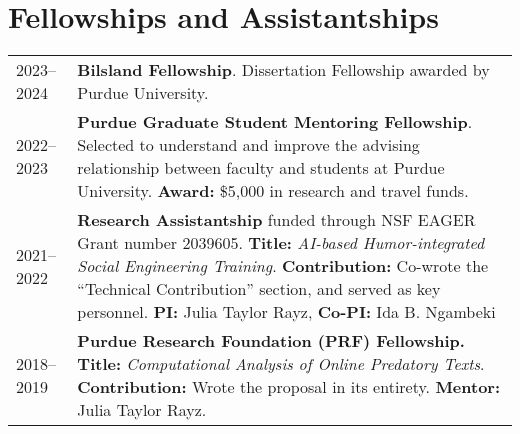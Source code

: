 \documentclass[11pt]{article}
\begin{document}
\section*{Fellowships and Assistantships}
\vspace{-.5em}
\renewcommand*{\arraystretch}{1.5}
\begin{tabularx}{\textwidth}{@{}p{} X}
2023--2024 & \textbf{Bilsland Fellowship}. Dissertation Fellowship awarded by Purdue University.\\
2022--2023 & \textbf{Purdue Graduate Student Mentoring Fellowship}. Selected to understand and improve the advising relationship between faculty and students at Purdue University. \textbf{Award:} \$5{,}000 in research and travel funds.\\
2021--2022 & \textbf{Research Assistantship} funded through NSF EAGER Grant number 2039605. \textbf{Title:} \emph{AI-based Humor-integrated Social Engineering Training}. \textbf{Contribution:} Co-wrote the ``Technical Contribution'' section, and served as key personnel. \textbf{PI:} Julia Taylor Rayz, \textbf{Co-PI:} Ida B. Ngambeki \\
2018--2019 & \textbf{Purdue Research Foundation (PRF) Fellowship.} \textbf{Title:} \textit{Computational Analysis of Online Predatory Texts}. \textbf{Contribution:} Wrote the proposal in its entirety. \textbf{Mentor:} Julia Taylor Rayz.\\
\end{tabularx}

\renewcommand*{\arraystretch}{1}
\end{document}
